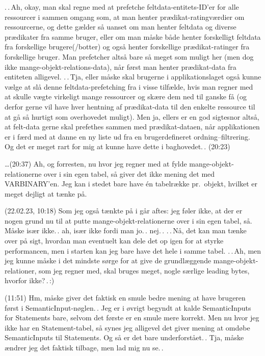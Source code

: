 \documentclass{report}
\begin{document}
.\,.\,Ah, okay, man skal regne med at prefetche feltdata-entitets-ID'er for alle ressourcer i sammen omgang som, at man henter prædikat-ratingværdier om ressourcerne, og dette gælder så uanset om man henter feltdata og diverse prædikater fra samme bruger, eller om man måske både henter forskelligt feltdata fra forskellige brugere(/botter) og også henter forskellige prædikat-ratinger fra forskellige bruger. Man prefetcher altså bare så meget som muligt her (men dog ikke mange-objekt-relations-data), når først man henter prædikat-data fra entiteten alligevel. .\,.\,Tja, eller måske skal brugerne i applikationslaget også kunne vælge at slå denne feltdata-prefetching fra i visse tilfælde, hvis man regner med at skulle vægte virkeligt mange ressourcer og skære dem ned til ganske få (og derfor gerne vil have hver hentning af prædikat-data til den enkelte ressource til at gå så hurtigt som overhovedet muligt). Men ja, ellers er en god sigtesnor altså, at felt-data gerne skal prefethes sammen med prædikat-dataen, når applikationen er i færd med at danne en ny liste ud fra en brugerdefineret ordning--filtrering. Og det er meget rart for mig at kunne have dette i baghovedet.\,. (20:23)

\ldots (20:37) Ah, og forresten, nu hvor jeg regner med at fylde mange-objekt-relationerne over i sin egen tabel, så giver det ikke mening det med VARBINARY'en. Jeg kan i stedet bare have én tabelrække pr.\ objekt, hvilket er meget dejligt at tænke på. 

(22.02.23, 10:18) Som jeg også tænkte på i går aftes: jeg føler ikke, at der er nogen grund nu til at putte mange-objekt-relationerne over i sin egen tabel, så. Måske især ikke.\,. ah, især ikke fordi man jo.\,. nej.\,. .\,.\,Nå, det kan man tænke over på sigt, hvordan man eventuelt kan dele det op igen for at styrke performancen, men i starten kan jeg bare have det hele i samme tabel. .\,.\,Ah, men jeg kunne måske i det mindste sørge for at give de grundlæggende mange-objekt-relationer, som jeg regner med, skal bruges meget, nogle særlige leading bytes, hvorfor ikke?\,.\,:) 

(11:51) Hm, måske giver det faktisk en smule bedre mening at have brugeren først i SemanticInput-nøglen.\,. Jeg er i øvrigt begyndt at kalde SemanticInputs for Statements bare, selvom det første er en smule mere korrekt. Men nu hvor jeg ikke har en Statement-tabel, så synes jeg alligevel det giver mening at omdøbe SemanticInputs til Statements. Og så er det bare underforstået.\,. Tja, måske ændrer jeg det faktisk tilbage, men lad mig nu se.\,.
\end{document}
